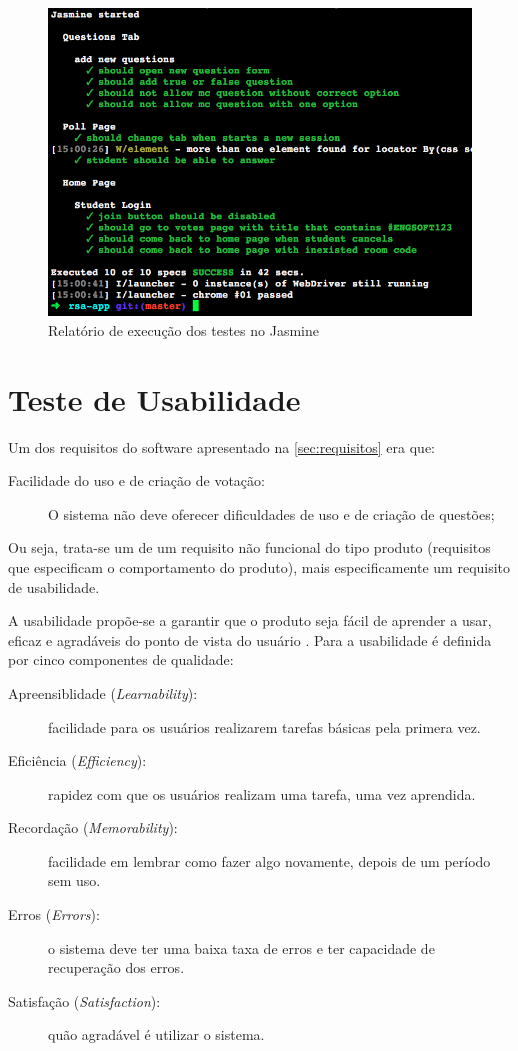 \begin{figure}[!ht]
  \centering
  \caption{Relatório de execução dos testes no Jasmine}
  \label{fig:protractor_output}
  \includegraphics[scale=0.6,valign=t]{imagens/jasmine_test}
  \doautor
\end{figure}

\clearpage

\section{Teste de Usabilidade}

Um dos requisitos do software apresentado na \autoref{sec:requisitos} era que:
\begin{description}
\item[Facilidade do uso e de criação de votação:] O sistema não deve oferecer
dificuldades de uso e de criação de questões;
\end{description}

Ou seja, trata-se um de um requisito não funcional do tipo produto (requisitos que
especificam o comportamento do produto), mais especificamente um requisito de usabilidade.

A usabilidade propõe-se a garantir que o produto seja fácil de aprender a usar, eficaz e
agradáveis do ponto de vista do usuário \cite{rogers2013design}.
Para  a usabilidade é definida por cinco componentes de qualidade:

\begin{description}
  \item[Apreensiblidade (\textit{Learnability}):] facilidade para os usuários realizarem tarefas básicas
  pela primera vez.
  \item[Eficiência (\textit{Efficiency}):] rapidez com que os usuários realizam uma tarefa, uma vez aprendida.
  \item[Recordação (\textit{Memorability}):] facilidade em lembrar como fazer algo novamente, depois de um período sem uso.
  \item[Erros (\textit{Errors}):] o sistema deve ter uma baixa taxa de erros e ter capacidade de
  recuperação dos erros.
  \item[Satisfação (\textit{Satisfaction}):] quão agradável é utilizar o sistema.
\end{description}

